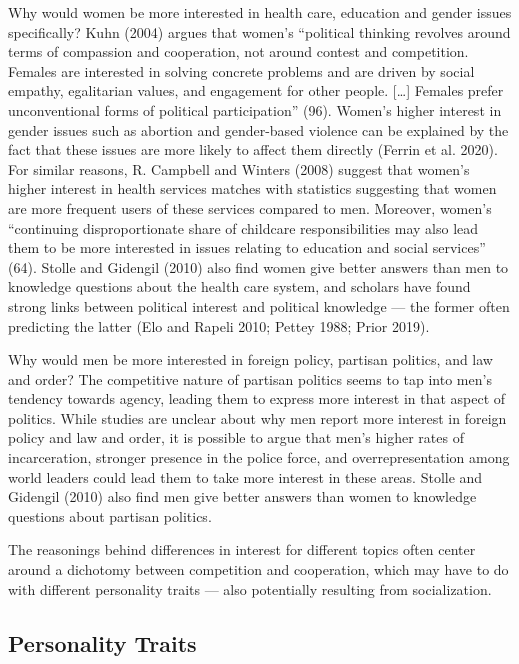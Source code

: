 \documentclass[
  letterpaper,
  DIV=11,
  numbers=noendperiod]{scrreprt}
\begin{document}
Why would women be more interested in health care, education and gender
issues specifically? Kuhn (2004) argues that women's ``political
thinking revolves around terms of compassion and cooperation, not around
contest and competition. Females are interested in solving concrete
problems and are driven by social empathy, egalitarian values, and
engagement for other people. {[}\ldots{]} Females prefer unconventional
forms of political participation'' (96). Women's higher interest in
gender issues such as abortion and gender-based violence can be
explained by the fact that these issues are more likely to affect them
directly (Ferrin et al. 2020). For similar reasons, R. Campbell and
Winters (2008) suggest that women's higher interest in health services
matches with statistics suggesting that women are more frequent users of
these services compared to men. Moreover, women's ``continuing
disproportionate share of childcare responsibilities may also lead them
to be more interested in issues relating to education and social
services'' (64). Stolle and Gidengil (2010) also find women give better
answers than men to knowledge questions about the health care system,
and scholars have found strong links between political interest and
political knowledge --- the former often predicting the latter (Elo and
Rapeli 2010; Pettey 1988; Prior 2019).

Why would men be more interested in foreign policy, partisan politics,
and law and order? The competitive nature of partisan politics seems to
tap into men's tendency towards agency, leading them to express more
interest in that aspect of politics. While studies are unclear about why
men report more interest in foreign policy and law and order, it is
possible to argue that men's higher rates of incarceration, stronger
presence in the police force, and overrepresentation among world leaders
could lead them to take more interest in these areas. Stolle and
Gidengil (2010) also find men give better answers than women to
knowledge questions about partisan politics.

The reasonings behind differences in interest for different topics often
center around a dichotomy between competition and cooperation, which may
have to do with different personality traits --- also potentially
resulting from socialization.

\hypertarget{personality-traits}{%
\subsection{Personality Traits}\label{personality-traits}}
\end{document}
